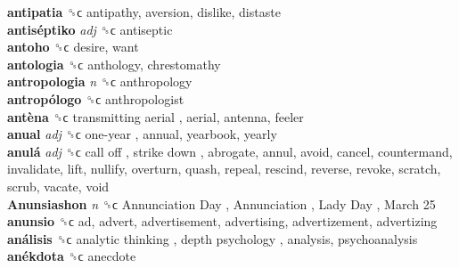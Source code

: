 \textbf{antipatia} ␝ϲ  antipathy, aversion, dislike, distaste  \\
\textbf{antiséptiko} \emph{adj}  ␝ϲ  antiseptic  \\
\textbf{antoho} ␝ϲ  desire, want  \\
\textbf{antologia} ␝ϲ  anthology, chrestomathy  \\
\textbf{antropologia} \emph{n}  ␝ϲ  anthropology  \\
\textbf{antropólogo} ␝ϲ  anthropologist  \\
\textbf{antèna} ␝ϲ   transmitting aerial , aerial, antenna, feeler  \\
\textbf{anual} \emph{adj}  ␝ϲ   one-year , annual, yearbook, yearly  \\
\textbf{anulá} \emph{adj}  ␝ϲ   call off ,  strike down , abrogate, annul, avoid, cancel, countermand, invalidate, lift, nullify, overturn, quash, repeal, rescind, reverse, revoke, scratch, scrub, vacate, void  \\
\textbf{Anunsiashon} \emph{n}  ␝ϲ   Annunciation Day ,  Annunciation ,  Lady Day ,  March 25   \\
\textbf{anunsio} ␝ϲ  ad, advert, advertisement, advertising, advertizement, advertizing  \\
\textbf{análisis} ␝ϲ   analytic thinking ,  depth psychology , analysis, psychoanalysis  \\
\textbf{anékdota} ␝ϲ  anecdote  \\
